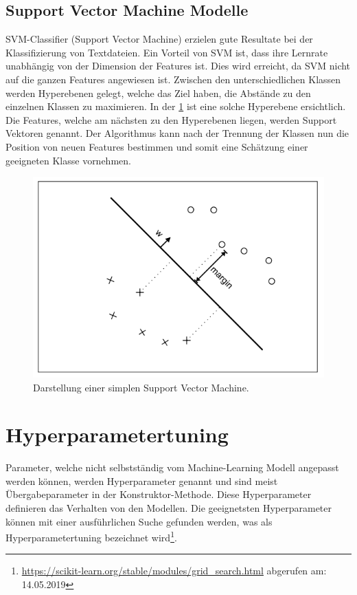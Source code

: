 \subsection{Support Vector Machine Modelle}
SVM-Classifier (Support Vector Machine) erzielen gute Resultate bei der Klassifizierung von Textdateien.
Ein Vorteil von SVM ist, dass ihre Lernrate unabhängig von der Dimension der Features ist\cite{joachims1998text}.
Dies wird erreicht, da SVM nicht auf die ganzen Features angewiesen ist.
Zwischen den unterschiedlichen Klassen werden Hyperebenen gelegt, welche das Ziel haben, die Abstände zu den einzelnen Klassen zu maximieren.
In der \cref{fig:svm} ist eine solche Hyperebene ersichtlich.
Die Features, welche am nächsten zu den Hyperebenen liegen, werden Support Vektoren genannt.
Der Algorithmus kann nach der Trennung der Klassen nun die Position von neuen Features bestimmen und somit eine Schätzung einer geeigneten Klasse vornehmen\cite{tong2001support}.
\begin{figure}[H]	
	\includegraphics[width=0.7\columnwidth,keepaspectratio]{img/svm.png}
	\caption{Darstellung einer simplen Support Vector Machine.}
	\label{fig:svm}
\end{figure}
\section{Hyperparametertuning}\label{sec:hyp}
Parameter, welche nicht selbstständig vom Machine-Learning Modell angepasst werden können, werden Hyperparameter genannt und sind meist Übergabeparameter in der Konstruktor-Methode.
Diese Hyperparameter definieren das Verhalten von den Modellen.
Die geeignetsten Hyperparameter können mit einer ausführlichen Suche gefunden werden, was als Hyperparametertuning bezeichnet wird\footnote{\url{https://scikit-learn.org/stable/modules/grid_search.html} abgerufen am: 14.05.2019}\cite{scikit-learn}.